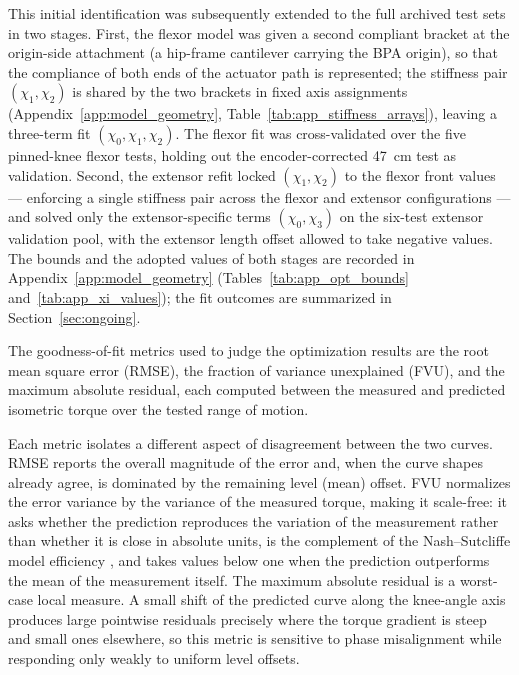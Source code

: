 This initial identification was subsequently extended to the full archived test sets in two stages. First, the flexor model was given a second compliant bracket at the origin-side attachment (a hip-frame cantilever carrying the BPA origin), so that the compliance of both ends of the actuator path is represented; the stiffness pair $(\chi_{1}, \chi_{2})$ is shared by the two brackets in fixed axis assignments (Appendix~\ref{app:model_geometry}, Table~\ref{tab:app_stiffness_arrays}), leaving a three-term fit $(\chi_{0}, \chi_{1}, \chi_{2})$. The flexor fit was cross-validated over the five pinned-knee flexor tests, holding out the encoder-corrected \qty{47}{\cm} test as validation. Second, the extensor refit locked $(\chi_{1}, \chi_{2})$ to the flexor front values --- enforcing a single stiffness pair across the flexor and extensor configurations --- and solved only the extensor-specific terms $(\chi_{0}, \chi_{3})$ on the six-test extensor validation pool, with the extensor length offset allowed to take negative values. The bounds and the adopted values of both stages are recorded in Appendix~\ref{app:model_geometry} (Tables~\ref{tab:app_opt_bounds} and~\ref{tab:app_xi_values}); the fit outcomes are summarized in Section~\ref{sec:ongoing}.

The goodness-of-fit metrics used to judge the optimization results are the root mean square error (RMSE), the fraction of variance unexplained (FVU), and the maximum absolute residual, each computed between the measured and predicted isometric torque over the tested range of motion.

Each metric isolates a different aspect of disagreement between the two curves. RMSE reports the overall magnitude of the error and, when the curve shapes already agree, is dominated by the remaining level (mean) offset. FVU normalizes the error variance by the variance of the measured torque, making it scale-free: it asks whether the prediction reproduces the variation of the measurement rather than whether it is close in absolute units, is the complement of the Nash--Sutcliffe model efficiency \citep{nash_river_1970}, and takes values below one when the prediction outperforms the mean of the measurement itself. The maximum absolute residual is a worst-case local measure. A small shift of the predicted curve along the knee-angle axis produces large pointwise residuals precisely where the torque gradient is steep and small ones elsewhere, so this metric is sensitive to phase misalignment while responding only weakly to uniform level offsets.

